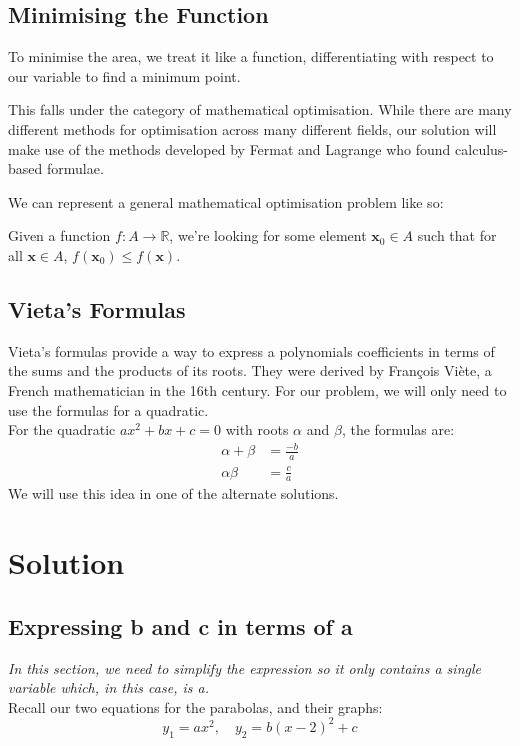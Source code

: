 \documentclass[a4paper,11pt]{article}
\theoremstyle{definition}
\begin{document}
\subsection{Minimising the Function}
To minimise the area, we treat it like a function, differentiating with respect to our variable to find a minimum point.

This falls under the category of mathematical optimisation. While there are many different methods for optimisation across many different fields, our solution will make use of the methods developed by Fermat and Lagrange who found calculus-based formulae.

We can represent a general mathematical optimisation problem like so:

Given a function $f : A \rightarrow \mathbb{R}$, we're looking for some element $\mathbf{x}_0\in A$ such that for all $\mathbf{x}\in A$, $f(\mathbf{x}_0)\leq f(\mathbf{x})$.



\subsection{Vieta's Formulas}
Vieta's formulas provide a way to express a polynomials coefficients in terms of the sums and the products of its roots. They were derived by François Viète, a French mathematician in the 16th century. For our problem, we will only need to use the formulas for a quadratic. \\For the quadratic $ax^2+bx+c=0$ with roots $\alpha$ and $\beta$, the formulas are:
\begin{align*}
    \alpha+\beta&=\frac{-b}{a}\\
    \alpha\beta&=\frac{c}{a}
\end{align*}
We will use this idea in one of the alternate solutions. 

\section{Solution}
\subsection{Expressing b and c in terms of a}
\textit{In this section, we need to simplify the expression so it only contains a single variable which, in this case, is a. }\\

\noindent Recall our two equations for the parabolas, and their graphs:
\[y_1 = ax^2, \quad y_2 = b(x-2)^2 + c\]
\end{document}
